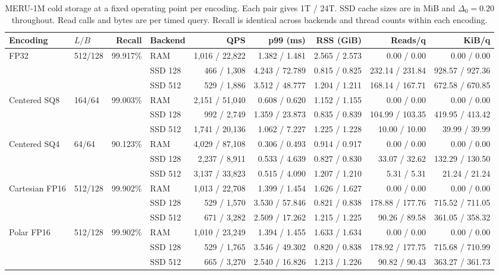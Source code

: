 \begin{table}[t]
  \centering
  \caption{MERU-1M cold storage at a fixed operating point per encoding. Each pair gives 1T / 24T. SSD cache sizes are in MiB and $\Delta_0=0.20$ throughout. Read calls and bytes are per timed query. Recall is identical across backends and thread counts within each encoding.}
  \label{tab:ssd_backends}
  \small\setlength{\tabcolsep}{5pt}
  \begin{tabular}{@{}llrlrrrrr@{}}
  \toprule
  Encoding & $L/B$ & Recall & Backend & QPS & p99 (ms) & RSS (GiB) & Reads/q & KiB/q \\
  \midrule
  FP32 & 512/128 & 99.917\% & RAM & 1,016 / 22,822 & 1.382 / 1.481 & 2.565 / 2.573 & 0.00 / 0.00 & 0.00 / 0.00 \\
   &  &  & SSD 128 & 466 / 1,308 & 4.243 / 72.789 & 0.815 / 0.825 & 232.14 / 231.84 & 928.57 / 927.36 \\
   &  &  & SSD 512 & 529 / 1,886 & 3.512 / 48.777 & 1.204 / 1.211 & 168.14 / 167.71 & 672.58 / 670.85 \\
  \midrule
  Centered SQ8 & 164/64 & 99.003\% & RAM & 2,151 / 51,040 & 0.608 / 0.620 & 1.152 / 1.155 & 0.00 / 0.00 & 0.00 / 0.00 \\
   &  &  & SSD 128 & 992 / 2,749 & 1.359 / 23.873 & 0.835 / 0.839 & 104.99 / 103.35 & 419.95 / 413.42 \\
   &  &  & SSD 512 & 1,741 / 20,136 & 1.062 / 7.227 & 1.225 / 1.228 & 10.00 / 10.00 & 39.99 / 39.99 \\
  \midrule
  Centered SQ4 & 64/64 & 90.123\% & RAM & 4,029 / 87,108 & 0.306 / 0.493 & 0.914 / 0.917 & 0.00 / 0.00 & 0.00 / 0.00 \\
   &  &  & SSD 128 & 2,237 / 8,911 & 0.533 / 4.639 & 0.827 / 0.830 & 33.07 / 32.62 & 132.29 / 130.50 \\
   &  &  & SSD 512 & 3,137 / 33,823 & 0.515 / 4.090 & 1.207 / 1.210 & 5.31 / 5.31 & 21.24 / 21.24 \\
  \midrule
  Cartesian FP16 & 512/128 & 99.902\% & RAM & 1,013 / 22,708 & 1.399 / 1.454 & 1.626 / 1.627 & 0.00 / 0.00 & 0.00 / 0.00 \\
   &  &  & SSD 128 & 529 / 1,570 & 3.530 / 57.846 & 0.821 / 0.838 & 178.88 / 177.76 & 715.52 / 711.05 \\
   &  &  & SSD 512 & 671 / 3,282 & 2.509 / 17.262 & 1.215 / 1.225 & 90.26 / 89.58 & 361.05 / 358.32 \\
  \midrule
  Polar FP16 & 512/128 & 99.902\% & RAM & 1,010 / 23,249 & 1.394 / 1.455 & 1.633 / 1.634 & 0.00 / 0.00 & 0.00 / 0.00 \\
   &  &  & SSD 128 & 529 / 1,765 & 3.546 / 49.302 & 0.820 / 0.838 & 178.92 / 177.75 & 715.68 / 710.99 \\
   &  &  & SSD 512 & 665 / 3,270 & 2.540 / 16.826 & 1.213 / 1.226 & 90.82 / 90.43 & 363.27 / 361.73 \\
  \bottomrule
  \end{tabular}
\end{table}
